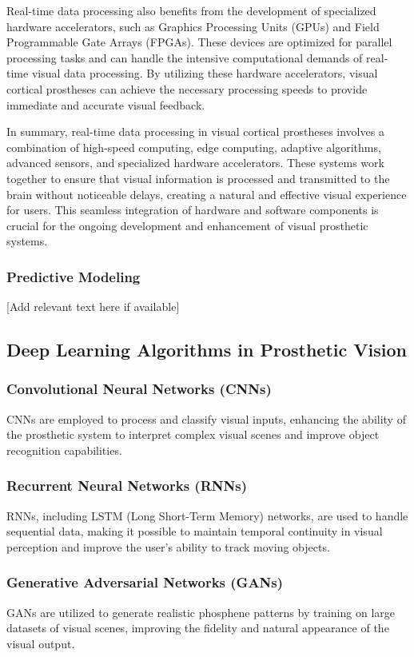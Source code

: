 \documentclass[twocolumn,10pt]{article}
\begin{document}
Real-time data processing also benefits from the development of specialized
hardware accelerators, such as Graphics Processing Units (GPUs) and Field
Programmable Gate Arrays (FPGAs). These devices are optimized for parallel
processing tasks and can handle the intensive computational demands of real-time
visual data processing. By utilizing these hardware accelerators, visual
cortical prostheses can achieve the necessary processing speeds to provide
immediate and accurate visual feedback.

In summary, real-time data processing in visual cortical prostheses involves a
combination of high-speed computing, edge computing, adaptive algorithms,
advanced sensors, and specialized hardware accelerators. These systems work
together to ensure that visual information is processed and transmitted to the
brain without noticeable delays, creating a natural and effective visual
experience for users. This seamless integration of hardware and software
components is crucial for the ongoing development and enhancement of visual
prosthetic systems.

\subsubsection*{Predictive Modeling}
[Add relevant text here if available]

\subsection{Deep Learning Algorithms in Prosthetic Vision}
\subsubsection*{Convolutional Neural Networks (CNNs)}
CNNs are employed to process and classify visual inputs, enhancing the ability
of the prosthetic system to interpret complex visual scenes and improve object
recognition capabilities.

\subsubsection*{Recurrent Neural Networks (RNNs)}
RNNs, including LSTM (Long Short-Term Memory) networks, are used to handle
sequential data, making it possible to maintain temporal continuity in visual
perception and improve the user's ability to track moving objects.

\subsubsection*{Generative Adversarial Networks (GANs)}
GANs are utilized to generate realistic phosphene patterns by training on large
datasets of visual scenes, improving the fidelity and natural appearance of the
visual output.
\end{document}

